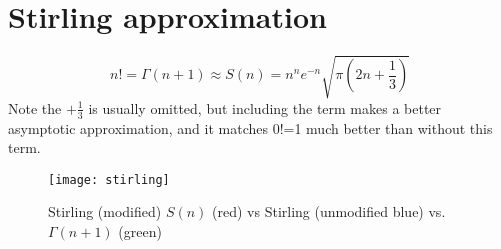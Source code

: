 \section{Stirling approximation}
\begin{equation}
n!=\Gamma(n+1) \approx S(n) = n^n e^{-n} \sqrt{\pi \left(2n+\frac{1}{3}\right)}
\end{equation}
Note the $+\frac{1}{3}$ is usually omitted, but including the term makes a better asymptotic approximation, and it matches 0!=1 much better than without this term.

\begin{figure}
  \caption{Stirling (modified) $S(n)$ (red) vs Stirling (unmodified blue) vs. $\Gamma(n+1)$ (green)}
  \centering
    \texttt{[image: stirling]}
\end{figure}
